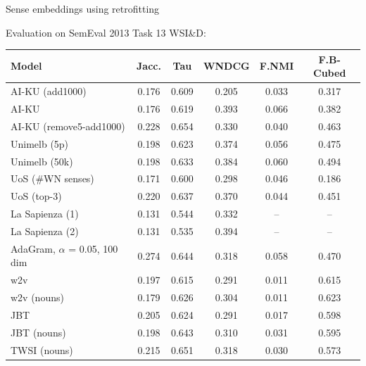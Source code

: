 \begin{frame}{Sense embeddings using retrofitting}

Evaluation on SemEval 2013 Task 13  WSI\&D:


	\vspace{-0.4cm}
	\begin{table}
		\scriptsize

		\begin{tabular}{l|ccc|cc}
			\bf Model & \bf Jacc. & \bf Tau & \bf WNDCG & \bf F.NMI & \bf F.B-Cubed \\ 
			\midrule
			
			AI-KU (add1000) & 0.176 & 0.609 & 0.205 & 0.033 & 0.317 \\
			AI-KU & 0.176 & 0.619 & 0.393 & 0.066 & 0.382 \\
			AI-KU (remove5-add1000) & 0.228 & 0.654 & 0.330 & 0.040 & 0.463 \\
			Unimelb (5p) & 0.198 & 0.623 & 0.374 & 0.056 & 0.475 \\
			Unimelb (50k) & 0.198 & 0.633 & 0.384 & 0.060 & 0.494 \\
			UoS (\#WN senses) & 0.171 & 0.600 & 0.298 & 0.046 & 0.186 \\
			UoS (top-3) & 0.220 & 0.637 & 0.370 & 0.044 & 0.451 \\
			La Sapienza (1) & 0.131 & 0.544 & 0.332 & --  & -- \\
			La Sapienza (2) & 0.131 & 0.535 & 0.394 & -- & -- \\ \midrule
			AdaGram, $\alpha$ = 0.05, 100 dim & 0.274 & 0.644  & 0.318  & 0.058  & 0.470  \\ \midrule
			\alert{w2v}  & 0.197 & 0.615 & 0.291 & 0.011 & 0.615 \\
			\alert{w2v (nouns)} & 0.179 & 0.626 & 0.304 & 0.011 & 0.623 \\
			
			\alert{JBT} & 0.205 & 0.624 & 0.291 & 0.017 & 0.598\\
			\alert{JBT (nouns)} & 0.198 & 0.643 & 0.310 & 0.031 & 0.595\\
			\alert{TWSI (nouns)} & 0.215 & 0.651 & 0.318 & 0.030 & 0.573 \\ 
				
		\end{tabular}
		\end{table}
\end{frame}





